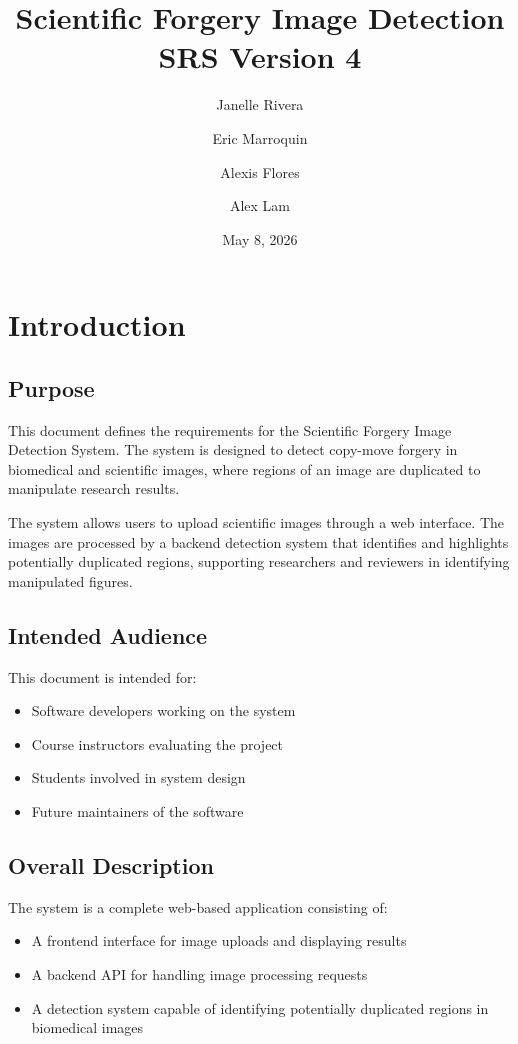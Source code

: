 \documentclass[12pt]{article}
\title{Scientific Forgery Image Detection\\SRS Version 4}
\author{Janelle Rivera \and Eric Marroquin \and Alexis Flores \and Alex Lam}
\date{May 8, 2026}
\begin{document}
\maketitle

\tableofcontents
\newpage

\section{Introduction}

\subsection{Purpose}

This document defines the requirements for the Scientific Forgery Image Detection
System. The system is designed to detect copy-move forgery in biomedical and
scientific images, where regions of an image are duplicated to manipulate research
results.

The system allows users to upload scientific images through a web interface. The
images are processed by a backend detection system that identifies and highlights
potentially duplicated regions, supporting researchers and reviewers in identifying
manipulated figures.

\subsection{Intended Audience}

This document is intended for:

\begin{itemize}
    \item Software developers working on the system
    \item Course instructors evaluating the project
    \item Students involved in system design
    \item Future maintainers of the software
\end{itemize}

\subsection{Overall Description}

The system is a complete web-based application consisting of:

\begin{itemize}
    \item A frontend interface for image uploads and displaying results
    \item A backend API for handling image processing requests
    \item A detection system capable of identifying potentially duplicated regions in biomedical images
\end{itemize}
\end{document}

